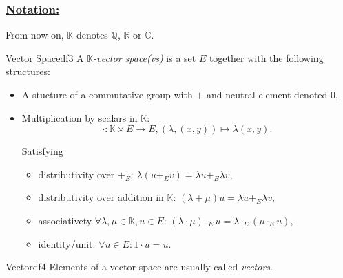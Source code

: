 \documentclass[11pt, a4paper]{article}
\newcommand{\R}{\mathbb{R}}
\newcommand{\Q}{\mathbb{Q}}
\newcommand{\C}{\mathbb{C}}
\newcommand{\K}{\mathbb{K}}
\begin{document}
\subsubsection*{\underline{Notation:}}
From now on, $\K$ denotes $\Q$, $\R$ or $\C$.

\begin{definition}{Vector Space}{df3}
  A $\K$\emph{-vector space(vs)} is a set $E$ together with the following structures:
  \begin{itemize}
    \item A stucture of a commutative group with $+$ and neutral element denoted $0$,
    \item Multiplication by scalars in $\K$: 
    \[
      \cdot: \K \times E \longrightarrow E, (\lambda, (x, y)) \longmapsto \lambda (x, y) \text{.}
    \]

    Satisfying
    \begin{itemize}
      \item distributivity over $+_E$: $\lambda (u +_E v) = \lambda u +_E \lambda v$,
      \item distributivity over addition in $\K$: $(\lambda + \mu) u = \lambda u +_E \lambda v$,
      \item associativety $\forall \lambda, \mu \in \K, u \in E$: $(\lambda \cdot \mu) \cdot_E u = \lambda \cdot_E (\mu \cdot_E u)$,
      \item identity/unit: $\forall u \in E: 1 \cdot u = u$.
    \end{itemize}
  \end{itemize}
  
\end{definition}

\begin{definition}{Vector}{df4}
  Elements of a vector space are usually called \emph{vectors}.
\end{definition}
\end{document}
